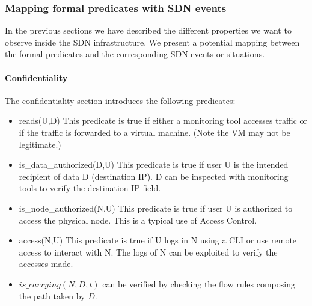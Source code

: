 \subsubsection{Mapping formal predicates with SDN events}
\label{sec:extending-model}
In the previous sections we have described the different properties we want to observe inside the SDN infrastructure.
We present a potential mapping between the formal predicates and the corresponding SDN events or situations.


\paragraph{Confidentiality}
The confidentiality section introduces the following predicates:
\begin{itemize}
\item reads(U,D)
\newline
This predicate is true if either a monitoring tool accesses traffic or if the traffic is forwarded to a virtual machine. (Note the VM may not be legitimate.)

\item is\_data\_authorized(D,U)
\newline
This predicate is true if user U is the intended recipient of data D (\eg destination IP).
D can be inspected with monitoring tools to verify the destination IP field.
\item is\_node\_authorized(N,U)
\newline
This predicate is true if user U is authorized to access the physical node.
This is a typical use of Access Control.
\item access(N,U)
\newline
This predicate is true if U logs in N using a CLI or use remote access to interact with N.
The logs of N can be exploited to verify the accesses made.
\item $is\_carrying(N,D,t)$ can be verified by checking the flow rules composing the path taken by $D$.
\end{itemize}

